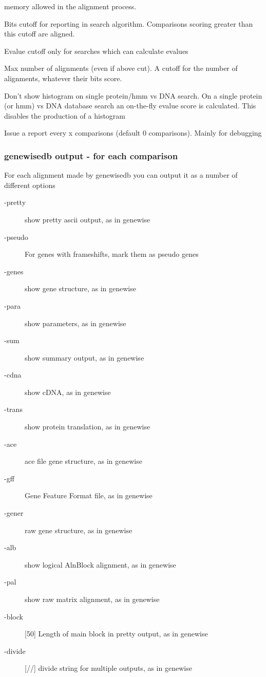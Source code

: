 \documentclass{article}
\begin{document}
\begin{description}
	memory allowed in the alignment process.
\item[-cut]    [20.00]   Bits cutoff for reporting in search algorithm. Comparisons scoring greater
than this cutoff are aligned.
\item[-ecut]   [n/a]     Evalue cutoff only for searches which can calculate evalues
\item[-aln]    [50]   Max number of alignments (even if above cut). A cutoff for the number of 
alignments, whatever their bits score.
\item[-nohis]           Don't show histogram on single protein/hmm vs DNA search.
On a single protein (or hmm) vs DNA database search an on-the-fly evalue score is calculated.
This disables the production of a histogram
\item[-report] [0]      Issue a report every x comparisons (default 0 comparisons). Mainly for debugging
\end{description}
\subsubsection{genewisedb output - for each comparison}
For each alignment made by genewisedb you can output it as a number
of different options
\begin{description}
\item[-pretty]          show pretty ascii output, as in genewise
\item[-pseudo]          For genes with frameshifts, mark them as pseudo genes
\item[-genes]           show gene structure, as in genewise
\item[-para]            show parameters, as in genewise
\item[-sum]             show summary output, as in genewise
\item[-cdna]            show cDNA, as in genewise
\item[-trans]           show protein translation, as in genewise
\item[-ace]             ace file gene structure, as in genewise
\item[-gff]             Gene Feature Format file, as in genewise
\item[-gener]           raw gene structure, as in genewise
\item[-alb]             show logical AlnBlock alignment, as in genewise
\item[-pal]             show raw matrix alignment, as in genewise
\item[-block]  [50]     Length of main block in pretty output, as in genewise
\item[-divide] [//]     divide string for multiple outputs, as in genewise
\end{description}
\end{document}
